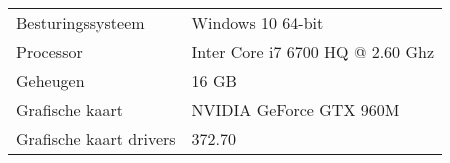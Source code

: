 \begin{table}[h!]
  \begin{tabular}{@{}ll@{}}\toprule
    Besturingssysteem       & Windows 10 64-bit                \\
    Processor               & Inter Core i7 6700 HQ @ 2.60 Ghz \\
    Geheugen                & 16 GB                            \\
    Grafische kaart         & NVIDIA GeForce GTX 960M          \\
    Grafische kaart drivers & 372.70                           \\ \bottomrule
  \end{tabular}
\end{table}

